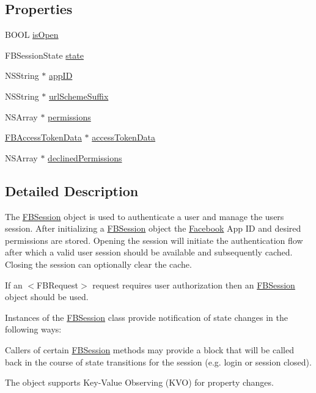 \subsection*{Properties}
\begin{DoxyCompactItemize}
\item 
B\+O\+OL \hyperlink{interfaceFBSession_ae2c48c214a7a04c16739a7a10c90b03e}{is\+Open}
\item 
F\+B\+Session\+State \hyperlink{interfaceFBSession_a0b25c735da32c34217d482ce2658a76e}{state}
\item 
N\+S\+String $\ast$ \hyperlink{interfaceFBSession_ad6c53ffa2d041dec94a79bdfcb30aafe}{app\+ID}
\item 
N\+S\+String $\ast$ \hyperlink{interfaceFBSession_a207345e1a1ca06ee59a56a6b0d78231a}{url\+Scheme\+Suffix}
\item 
N\+S\+Array $\ast$ \hyperlink{interfaceFBSession_ad8a201a8de50f40ba5b266fca5c533f8}{permissions}
\item 
\hyperlink{interfaceFBAccessTokenData}{F\+B\+Access\+Token\+Data} $\ast$ \hyperlink{interfaceFBSession_a77d239a0dfeab500070b81d829c01805}{access\+Token\+Data}
\item 
N\+S\+Array $\ast$ \hyperlink{interfaceFBSession_adbc87bbf09697c6f40b3394b2432016d}{declined\+Permissions}
\end{DoxyCompactItemize}


\subsection{Detailed Description}
The {\ttfamily \hyperlink{interfaceFBSession}{F\+B\+Session}} object is used to authenticate a user and manage the user\textquotesingle{}s session. After initializing a {\ttfamily \hyperlink{interfaceFBSession}{F\+B\+Session}} object the \hyperlink{interfaceFacebook}{Facebook} App ID and desired permissions are stored. Opening the session will initiate the authentication flow after which a valid user session should be available and subsequently cached. Closing the session can optionally clear the cache.

If an $<$\+F\+B\+Request$>$ request requires user authorization then an {\ttfamily \hyperlink{interfaceFBSession}{F\+B\+Session}} object should be used.

Instances of the {\ttfamily \hyperlink{interfaceFBSession}{F\+B\+Session}} class provide notification of state changes in the following ways\+:


\begin{DoxyEnumerate}
\item Callers of certain {\ttfamily \hyperlink{interfaceFBSession}{F\+B\+Session}} methods may provide a block that will be called back in the course of state transitions for the session (e.\+g. login or session closed).
\item The object supports Key-\/\+Value Observing (K\+VO) for property changes. 
\end{DoxyEnumerate}

